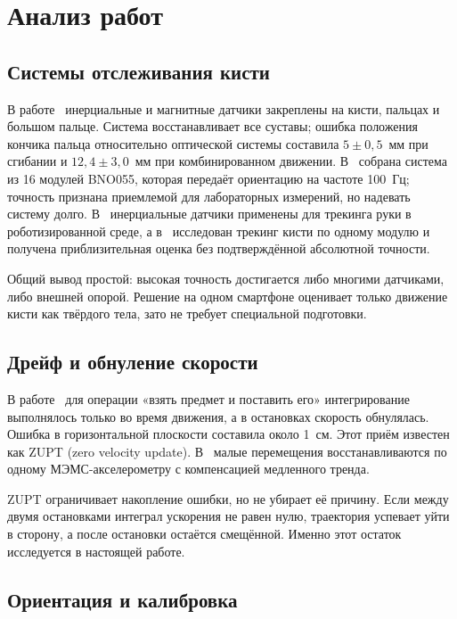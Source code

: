 \documentclass{misisarticle}
\begin{document}
\section{Анализ работ}

\subsection{Системы отслеживания кисти}

В работе~\cite{kortier} инерциальные и магнитные датчики закреплены на кисти, пальцах и большом пальце. Система восстанавливает все суставы; ошибка положения кончика пальца относительно оптической системы составила $5\pm0{,}5$~мм при сгибании и $12{,}4\pm3{,}0$~мм при комбинированном движении. В~\cite{shenoy} собрана система из 16 модулей BNO055, которая передаёт ориентацию на частоте 100~Гц; точность признана приемлемой для лабораторных измерений, но надевать систему долго. В~\cite{pellois} инерциальные датчики применены для трекинга руки в роботизированной среде, а в~\cite{miyazaki} исследован трекинг кисти по одному модулю и получена приблизительная оценка без подтверждённой абсолютной точности.

Общий вывод простой: высокая точность достигается либо многими датчиками, либо внешней опорой. Решение на одном смартфоне оценивает только движение кисти как твёрдого тела, зато не требует специальной подготовки.

\subsection{Дрейф и обнуление скорости}

В работе~\cite{neto} для операции «взять предмет и поставить его» интегрирование выполнялось только во время движения, а в остановках скорость обнулялась. Ошибка в горизонтальной плоскости составила около 1~см. Этот приём известен как ZUPT (zero velocity update). В~\cite{niu} малые перемещения восстанавливаются по одному МЭМС-акселерометру с компенсацией медленного тренда.

ZUPT ограничивает накопление ошибки, но не убирает её причину. Если между двумя остановками интеграл ускорения не равен нулю, траектория успевает уйти в сторону, а после остановки остаётся смещённой. Именно этот остаток исследуется в настоящей работе.

\subsection{Ориентация и калибровка}
\end{document}
